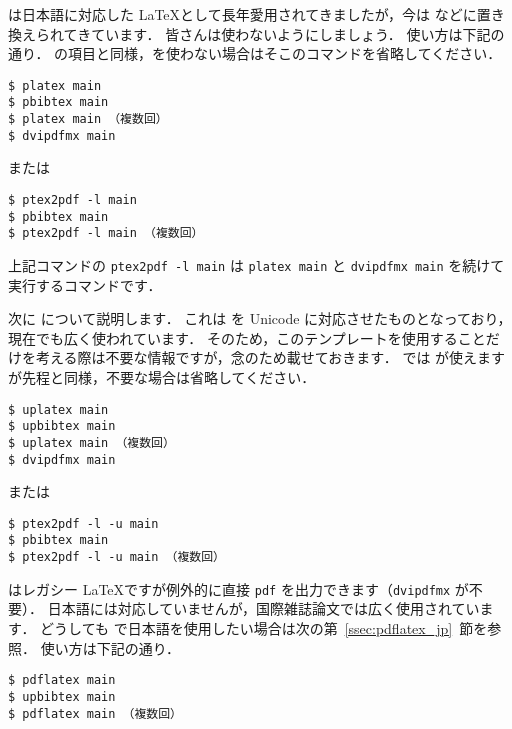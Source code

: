 \pLaTeX は日本語に対応した \LaTeX として長年愛用されてきましたが，今は \LuaLaTeX などに置き換えられてきています．
皆さんは使わないようにしましょう．
使い方は下記の通り．
\LuaLaTeX の項目と同様，\BibTeX を使わない場合はそこのコマンドを省略してください．

\begin{tcolorbox}[enhanced, title=\pLaTeX$+$\pBibTeX, drop fuzzy shadow]
\begin{verbatim}
$ platex main
$ pbibtex main
$ platex main （複数回）
$ dvipdfmx main
\end{verbatim}
または
\begin{verbatim}
$ ptex2pdf -l main
$ pbibtex main
$ ptex2pdf -l main （複数回）
\end{verbatim}
\end{tcolorbox}

上記コマンドの \verb|ptex2pdf -l main| は \verb|platex main| と \verb|dvipdfmx main| を続けて実行するコマンドです．

次に \upLaTeX について説明します．
これは \pLaTeX を Unicode に対応させたものとなっており，現在でも広く使われています．
そのため，このテンプレートを使用することだけを考える際は不要な情報ですが，念のため載せておきます．
\upLaTeX では \upBibTeX が使えますが先程と同様，不要な場合は省略してください．

\begin{tcolorbox}[enhanced, title=\upLaTeX$+$\upBibTeX, drop fuzzy shadow]
\begin{verbatim}
$ uplatex main
$ upbibtex main
$ uplatex main （複数回）
$ dvipdfmx main
\end{verbatim}
または
\begin{verbatim}
$ ptex2pdf -l -u main
$ pbibtex main
$ ptex2pdf -l -u main （複数回）
\end{verbatim}
\end{tcolorbox}

\pLaTeX はレガシー \LaTeX ですが例外的に直接 \verb|pdf| を出力できます（\verb|dvipdfmx| が不要）．
日本語には対応していませんが，国際雑誌論文では広く使用されています．
どうしても \pdfLaTeX で日本語を使用したい場合は次の第~\ref{ssec:pdflatex_jp}~節を参照．
使い方は下記の通り．

\begin{tcolorbox}[enhanced, title=\pdfLaTeX$+$\upBibTeX, drop fuzzy shadow]
\begin{verbatim}
$ pdflatex main
$ upbibtex main
$ pdflatex main （複数回）
\end{verbatim}
\end{tcolorbox}


